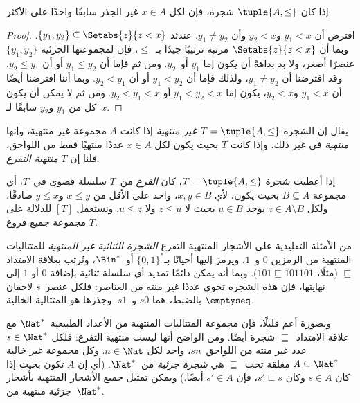 \documentclass[../../../include/open-logic-section]{subfiles}
\begin{document}
\begin{prop}
إذا كان $\tuple{A,\le}$ شجرة، فإن لكل $x \in A$ غير الجذر سابقًا واحدًا
على الأكثر.
\end{prop}

\begin{proof}
  افترض أن $y_1 < x$ و$y_2 < x$ وأن $y_1 \neq y_2$. عندئذ
  $\{y_1, y_2\} \subseteq \Setabs{z}{z<x}$. وبما أن
  $\Setabs{z}{z<x}$ مرتبة ترتيبًا جيدًا بـ~$\le$، فإن لمجموعتها الجزئية
  $\{y_1, y_2\}$ عنصرًا أصغر، ولا بد بداهةً أن يكون إما $y_1$ أو~$y_2$.
  ومن ثم فإما أن $y_1 \le y_2$ أو أن $y_2 \le y_1$. وقد افترضنا أن
  $y_1 \neq y_2$، ولذلك فإما أن $y_1 < y_2$ أو أن $y_2 < y_1$. وبما
  أننا افترضنا أيضًا أن $y_1 < x$ و$y_2 < x$، يكون إما
  $y_1 < y_2 < x$ أو $y_2 < y_1 < x$. ومن ثم لا يمكن أن يكون كل من
  $y_1$ و$y_2$ سابقًا لـ~$x$.
\end{proof}

\begin{defn}
يقال إن الشجرة $T = \tuple{A, \le}$ \emph{غير منتهية} إذا كانت $A$
مجموعة غير منتهية، وإنها \emph{منتهية} في غير ذلك. وإذا كانت $T$ بحيث
يكون لكل $x \in A$ عددًا منتهيًا فقط من اللواحق، قلنا إن $T$
\emph{منتهية التفرع}.
\end{defn}

\begin{defn}[الفروع]
إذا أعطيت شجرة $T = \tuple{A, \le}$، كان \emph{الفرع} من~$T$ سلسلة
قصوى في~$T$، أي مجموعة $B \subseteq A$ بحيث يكون، لأي $x, y \in B$،
واحد على الأقل من $x \le y$ و$y \le x$ صادقًا، ولكل
$z \in A \setminus B$ يوجد $u \in B$ بحيث لا $z \le u$ ولا $u \le z$.
%
ونستعمل $[T]$ للدلالة على مجموعة جميع فروع $T$.
\end{defn}

\begin{ex}
من الأمثلة التقليدية على الأشجار المنتهية التفرع \emph{الشجرة الثنائية
غير المنتهية} للمتتاليات المنتهية من الرمزين $0$ و~$1$، ويرمز إليها
أحيانًا بـ$\{0,1\}^*$ أو~$\Bin^*$، وتُرتب بعلاقة الامتداد $\sqsubseteq$
(مثلًا، $101 \sqsubseteq 101101$). وبما أنه يمكن دائمًا تمديد أي سلسلة
ثنائية بإضافة $0$ أو $1$ إلى نهايتها، فإن هذه الشجرة تحوي عددًا غير
منته من العناصر: فلكل عنصر~$s$ لاحقان بالضبط، هما $s0$ و~$s1$. وجذرها
هو المتتالية الخالية $\emptyseq$.
\end{ex}

\begin{ex}
وبصورة أعم قليلًا، فإن مجموعة المتتاليات المنتهية من الأعداد
الطبيعية~$\Nat^*$ مع علاقة الامتداد~$\sqsubseteq$ شجرة أيضًا. ومن الواضح
أنها ليست منتهية التفرع: فلكل $s \in \Nat^*$ عدد غير منته من اللواحق~$sn$،
واحد لكل $n \in \Nat$. وكل مجموعة غير خالية $A \subseteq \Nat^*$ مغلقة
تحت~$\sqsubseteq$ هي \emph{شجرة جزئية} من~$\Nat^*$. (أي إن $A$ تكون بحيث
إذا كان $s \in A$ وكان $s' \sqsubseteq s$، فإن $s' \in A$ أيضًا.) ويمكن
تمثيل جميع الأشجار المنتهية بأشجار جزئية منتهية من~$\Nat^*$.
\end{ex}
\end{document}
